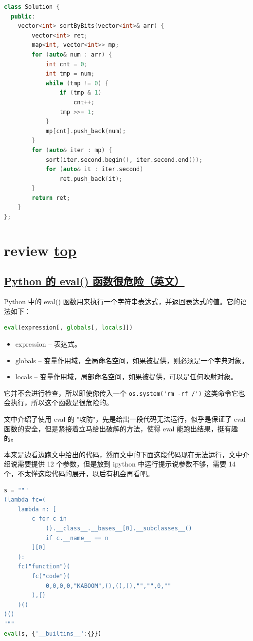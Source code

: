 \begin{lstlisting}[language=C++]
class Solution {
  public:
	vector<int> sortByBits(vector<int>& arr) {
		vector<int> ret;
		map<int, vector<int>> mp;
		for (auto& num : arr) {
			int cnt = 0;
			int tmp = num;
			while (tmp != 0) {
				if (tmp & 1)
					cnt++;
				tmp >>= 1;
			}
			mp[cnt].push_back(num);
		}
		for (auto& iter : mp) {
			sort(iter.second.begin(), iter.second.end());
			for (auto& it : iter.second)
				ret.push_back(it);
		}
		return ret;
	}
};
\end{lstlisting}

\section{review \hyperref[chap:w1]{top}}\label{w1:review}

\subsection{\href{https://nedbatchelder.com/blog/201206/eval_really_is_dangerous.html}{Python 的 eval() 函数很危险（英文）}}

Python 中的 eval() 函数用来执行一个字符串表达式，并返回表达式的值。它的语法如下：

\begin{lstlisting}[language=Python]
eval(expression[, globals[, locals]])
\end{lstlisting}

\begin{itemize}
	\item expression -- 表达式。
	\item globals -- 变量作用域，全局命名空间，如果被提供，则必须是一个字典对象。
	\item locals -- 变量作用域，局部命名空间，如果被提供，可以是任何映射对象。
\end{itemize}

它并不会进行检查，所以即使你传入一个 \lstinline{os.system('rm -rf /')} 这类命令它也会执行，所以这个函数是很危险的。

文中介绍了使用 eval 的 "攻防"，先是给出一段代码无法运行，似乎是保证了 eval 函数的安全，但是紧接着立马给出破解的方法，使得 eval 能跑出结果，挺有趣的。

本来是边看边跑文中给出的代码，然而文中的下面这段代码现在无法运行，文中介绍说需要提供 12 个参数，但是放到 ipython 中运行提示说参数不够，需要 14 个，不太懂这段代码的展开，以后有机会再看吧。

\begin{lstlisting}[language=Python]
s = """
(lambda fc=(
    lambda n: [
        c for c in
            ().__class__.__bases__[0].__subclasses__()
            if c.__name__ == n
        ][0]
    ):
    fc("function")(
        fc("code")(
            0,0,0,0,"KABOOM",(),(),(),"","",0,""
        ),{}
    )()
)()
"""
eval(s, {'__builtins__':{}})
\end{lstlisting}

